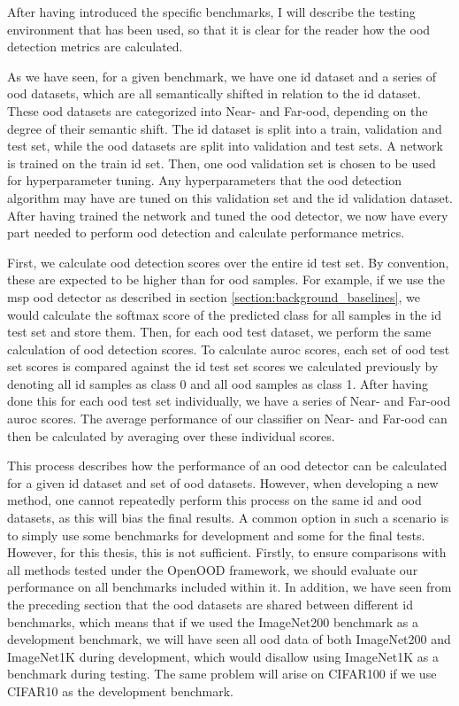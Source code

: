 \documentclass[UKenglish]{uiomasterthesis} %
\theoremstyle{definition}
\begin{document}
After having introduced the specific benchmarks, I will describe the testing environment that has been used, so that it is clear for the reader how the \ac{ood} detection metrics are calculated.

As we have seen, for a given benchmark, we have one \ac{id} dataset and a series of \ac{ood} datasets, which are all semantically shifted in relation to the \ac{id} dataset. These \ac{ood} datasets are categorized into Near- and Far-\ac{ood}, depending on the degree of their semantic shift. The \ac{id} dataset is split into a train, validation and test set, while the \ac{ood} datasets are split into validation and test sets. A network is trained on the train \ac{id} set.  Then, one \ac{ood} validation set is chosen to be used for hyperparameter tuning. Any hyperparameters that the \ac{ood} detection algorithm may have are tuned on this validation set and the \ac{id} validation dataset. After having trained the network and tuned the \ac{ood} detector, we now have every part needed to perform \ac{ood} detection and calculate performance metrics.

First, we calculate \ac{ood} detection scores over the entire \ac{id} test set. By convention, these are expected to be higher than for \ac{ood} samples. For example, if we use the \ac{msp} \ac{ood} detector as described in section \ref{section:background_baselines}, we would calculate the softmax score of the predicted class for all samples in the \ac{id} test set and store them. Then, for each \ac{ood} test dataset, we perform the same calculation of \ac{ood} detection scores. To calculate \ac{auroc} scores, each set of \ac{ood} test set scores is compared against the \ac{id} test set scores we calculated previously by denoting all \ac{id} samples as class 0 and all \ac{ood} samples as class 1. After having done this for each \ac{ood} test set individually, we have a series of Near- and Far-\ac{ood} \ac{auroc} scores. The average performance of our classifier on Near- and Far-\ac{ood} can then be calculated by averaging over these individual scores. %


This process describes how the performance of an \ac{ood} detector can be calculated for a given \ac{id} dataset and set of \ac{ood} datasets. However, when developing a new method, one cannot repeatedly perform this process on the same \ac{id} and \ac{ood} datasets, as this will bias the final results. A common option in such a scenario is to simply use some benchmarks for development and some for the final tests. However, for this thesis, this is not sufficient. Firstly, to ensure comparisons with all methods tested under the OpenOOD framework, we should evaluate our performance on all benchmarks included within it. In addition, we have seen from the preceding section that the \ac{ood} datasets are shared between different \ac{id} benchmarks, which means that if we used the ImageNet200 benchmark as a development benchmark, we will have seen all \ac{ood} data of both ImageNet200 and ImageNet1K during development, which would disallow using ImageNet1K as a benchmark during testing. The same problem will arise on CIFAR100 if we use CIFAR10 as the development benchmark.
\end{document}

